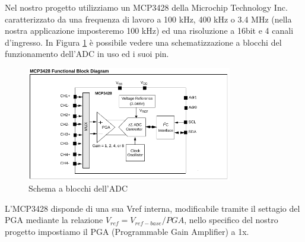 \documentclass[10pt]{article}
\begin{document}
		Nel nostro progetto utilizziamo un MCP3428 della Microchip Technology Inc. caratterizzato da una frequenza di lavoro a 100 kHz, 400 kHz o 3.4 MHz (nella nostra applicazione imposteremo 100 kHz) ed una risoluzione a 16bit e 4 canali d'ingresso. In Figura \ref{fig:adc} è possibile vedere una schematizzazione a blocchi del funzionamento dell'ADC in uso ed i suoi pin.
		\begin{figure}[h]
			\centering
			\includegraphics[width=0.8\textwidth]{src/adc_block}
			\caption{Schema a blocchi dell'ADC}\label{fig:adc}
		\end{figure}
		
		L'MCP3428 disponde di una sua Vref interna, modificabile tramite il settagio del PGA mediante la relazione $V_{ref}=V_{ref-base}/PGA$, nello specifico del nostro progetto impostiamo il PGA (Programmable Gain Amplifier) a 1x.
		
		
\end{document}
